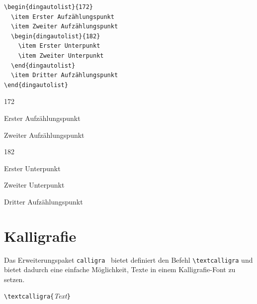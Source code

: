 \documentclass[a4paper,10pt,twoside]{scrbook}
\begin{document}
{%
\begin{minipage}[h]{0.5\textwidth}
\setlength{\parskip}{1em}
\frenchspacing
\begin{Verbatim}[frame=single]
\begin{dingautolist}{172}
  \item Erster Aufzählungspunkt
  \item Zweiter Aufzählungspunkt
  \begin{dingautolist}{182}
    \item Erster Unterpunkt
    \item Zweiter Unterpunkt
  \end{dingautolist}
  \item Dritter Aufzählungspunkt
\end{dingautolist}
\end{Verbatim}
\end{minipage}
\hfill
\begin{minipage}[h]{0.48\textwidth}
\setlength{\parskip}{1em}
\frenchspacing
\begin{dingautolist}{172}
  \item Erster Aufzählungspunkt
  \item Zweiter Aufzählungspunkt
  \begin{dingautolist}{182}
    \item Erster Unterpunkt
    \item Zweiter Unterpunkt
  \end{dingautolist}
  \item Dritter Aufzählungspunkt
\end{dingautolist}
\end{minipage}


\section{Kalligrafie}

Das Erweiterungspaket \verb!calligra!~\cite{Calligra_Dokumentation} bietet definiert den Befehl 
\verb!\textcalligra!
und bietet dadurch eine einfache Möglichkeit, Texte in einem 
Kalligrafie-Font zu setzen.


\begin{boxedminipage}{\textwidth}
\texttt{\textbackslash textcalligra\{}\textsl{Text}\texttt{\}}
\end{boxedminipage}


}
\end{document}
